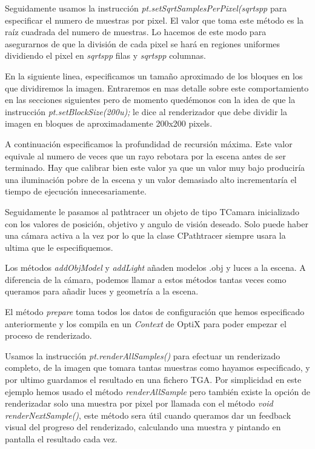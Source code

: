 \medskip

Seguidamente usamos la instrucción \emph{pt.setSqrtSamplesPerPixel(sqrtspp} para especificar el numero de muestras por pixel. El valor que toma este método es la raíz cuadrada del numero de muestras. Lo hacemos de este modo para asegurarnos de que la división de cada pixel se hará en regiones uniformes dividiendo el pixel en \emph{sqrtspp} filas y \emph{sqrtspp} columnas.

\medskip

En la siguiente linea, especificamos un tamaño aproximado de los bloques en los que dividiremos la imagen. Entraremos en mas detalle sobre este comportamiento en las secciones siguientes pero de momento quedémonos con la idea de que la instrucción \emph{pt.setBlockSize(200u);} le dice al renderizador que debe dividir la imagen en bloques de aproximadamente 200x200 pixels. 

\medskip

A continuación especificamos la profundidad de recursión máxima. Este valor equivale al numero de veces que un rayo rebotara por la escena antes de ser terminado. Hay que calibrar bien este valor ya que un valor muy bajo produciría una iluminación pobre de la escena y un valor demasiado alto incrementaría el tiempo de ejecución innecesariamente.

\medskip

Seguidamente le pasamos al pathtracer un objeto de tipo TCamara inicializado con los valores de posición, objetivo y angulo de visión deseado. Solo puede haber una cámara activa a la vez por lo que la clase CPathtracer siempre usara la ultima que le especifiquemos.

\medskip

Los métodos \emph{addObjModel} y \emph{addLight} añaden modelos .obj y luces a la escena. A diferencia de la cámara, podemos llamar a estos métodos tantas veces como queramos para añadir luces y geometría a la escena.

\medskip

El método \emph{prepare} toma todos los datos de configuración que hemos especificado anteriormente y los compila en un \emph{Context} de OptiX para poder empezar el proceso de renderizado.

\medskip

Usamos la instrucción \emph{pt.renderAllSamples()} para efectuar un renderizado completo, de la imagen que tomara tantas muestras como hayamos especificado, y por ultimo guardamos el resultado en una fichero TGA. Por simplicidad en este ejemplo hemos usado el método \emph{renderAllSample} pero también existe la opción de renderizadar solo una muestra por pixel por llamada con el método \emph{void renderNextSample()}, este método sera útil cuando queramos dar un feedback visual del progreso del renderizado, calculando una muestra y pintando en pantalla el resultado cada vez.

